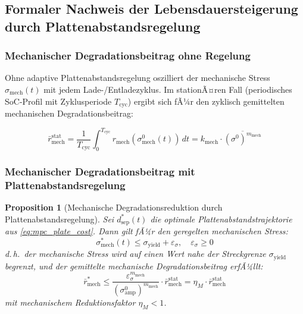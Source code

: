 ﻿\documentclass[12pt,a4paper]{article}
\newtheorem{proposition}[theorem]{Proposition}
\begin{document}
\subsection{Formaler Nachweis der Lebensdauersteigerung durch Plattenabstandsregelung}

\subsubsection{Mechanischer Degradationsbeitrag ohne Regelung}

Ohne adaptive Plattenabstandsregelung oszilliert der mechanische Stress
$\sigma_\mathrm{mech}(t)$ mit jedem Lade-/Entladezyklus. Im stationÃ¤ren
Fall (periodisches SoC-Profil mit Zyklusperiode $T_\mathrm{cyc}$) ergibt sich
fÃ¼r den zyklisch gemittelten mechanischen Degradationsbeitrag:

\begin{equation}
	\bar{r}_\mathrm{mech}^\mathrm{stat} = \frac{1}{T_\mathrm{cyc}}
	\int_0^{T_\mathrm{cyc}} r_\mathrm{mech}(\sigma_\mathrm{mech}^0(t))\, dt
	= k_\mathrm{mech} \cdot \overline{(\sigma^0)^{m_\mathrm{mech}}}
	\label{eq:mech_deg_static}
\end{equation}

\subsubsection{Mechanischer Degradationsbeitrag mit Plattenabstandsregelung}

\begin{proposition}[Mechanische Degradationsreduktion durch Plattenabstandsregelung]
	\label{prop:plate_deg}
	Sei $d_\mathrm{sep}^*(t)$ die optimale Plattenabstandstrajektorie aus
	\eqref{eq:mpc_plate_cost}. Dann gilt fÃ¼r den geregelten mechanischen Stress:
	\begin{equation}
		\sigma_\mathrm{mech}^*(t) \leq \sigma_\mathrm{yield} + \varepsilon_\sigma,
		\quad \varepsilon_\sigma \geq 0
	\end{equation}
	d.\,h.\ der mechanische Stress wird auf einen Wert nahe der Streckgrenze
	$\sigma_\mathrm{yield}$ begrenzt, und der gemittelte mechanische
	Degradationsbeitrag erfÃ¼llt:
	\begin{equation}
		\bar{r}_\mathrm{mech}^* \leq \frac{\varepsilon_\sigma^{m_\mathrm{mech}}}
		{(\sigma_\mathrm{amp}^0)^{m_\mathrm{mech}}} \cdot \bar{r}_\mathrm{mech}^\mathrm{stat}
		= \eta_M \cdot \bar{r}_\mathrm{mech}^\mathrm{stat}
		\label{eq:mech_deg_controlled}
	\end{equation}
	mit mechanischem Reduktionsfaktor $\eta_M < 1$.
\end{proposition}
\end{document}
